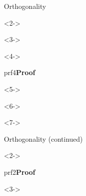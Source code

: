 \def\EMtitlesize{26}\def\EMtitleskip{31}
\begin{frame}{Orthogonality}
\begin{uncoverenv}<2->
\end{uncoverenv}
\EMgap
\begin{uncoverenv}<3->
\end{uncoverenv}
\EMgap
\begin{uncoverenv}<4->
\end{uncoverenv}
\EMgap
\begin{EMbox}{prf}{4}{\textbf{Proof}}
\begin{uncoverenv}<5->
\end{uncoverenv}
\EMgap
\begin{uncoverenv}<6->
\end{uncoverenv}
\EMgap
\begin{uncoverenv}<7->
\end{uncoverenv}
\end{EMbox}
\end{frame}

\def\EMtitlesize{26}\def\EMtitleskip{31}
\begin{frame}{Orthogonality (continued)}
\begin{uncoverenv}<2->
\end{uncoverenv}
\EMgap
\begin{EMbox}{prf}{2}{\textbf{Proof}}
\begin{uncoverenv}<3->
\end{uncoverenv}
\end{EMbox}
\end{frame}

